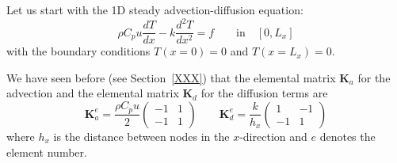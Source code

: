 
Let us start with the 1D steady advection-diffusion equation:
\begin{equation}
\rho C_p u \frac{dT}{dx} - k \frac{d^2T}{dx^2} = f \qquad \text{in} \quad [0,L_x]
\label{eq:fdm1Dad}
\end{equation}
with the boundary conditions $T(x=0)=0$ and $T(x=L_x)=0$.

We have seen before (see Section~\ref{XXX}) 
that the elemental matrix ${\bm K}_a$ for the advection and 
the elemental matrix  ${\bm K}_d$ for the diffusion terms are
\[
{\bm K}_a^e = \frac{\rho C_p u}{2} 
\left(
\begin{array}{cc}
-1 & 1 \\
-1 & 1 
\end{array}
\right)
\qquad
{\bm K}_d^e=\frac{k}{h_x}
\left(
\begin{array}{cc}
1 & -1 \\ 
-1 & 1
\end{array}
\right)
\]
where $h_x$ is the distance between nodes in the $x$-direction 
and $e$ denotes the element number. 

